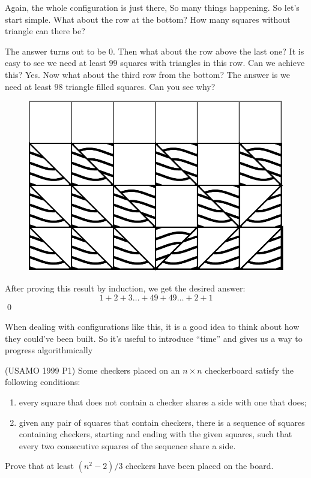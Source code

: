\documentclass[12pt,a4paper]{article}
\begin{document}
		\begin{solution}
			Again, the whole configuration is just there, So many things happening. So let's start simple. What about the row at the bottom? How many squares without triangle can there be?
			
			The answer turns out to be $ 0 $. Then what about the row above the last one? It is easy to see we need at least $ 99 $ squares with triangles in this row. Can we achieve this? Yes. Now what about the third row from the bottom? The answer is we need at least $ 98 $ triangle filled squares. Can you see why? 
			
			\begin{figure}[H]
				\begin{center}
					\includegraphics[width=.4\linewidth]{1.pdf}
				\end{center}
			\end{figure}
		
			After proving this result by induction, we get the desired answer:
			\[1+2+3\dots +49+49\dots + 2+1\]\hfill \qed
		\end{solution}
		
		
		When dealing with configurations like this, it is a good idea to think about how they could've been built. So it's useful to introduce ``time'' and gives us a way to progress algorithmically 
		
		\begin{example}(USAMO 1999 P1)
			Some checkers placed on an $ n \times n $ checkerboard satisfy the following conditions:
			
			\vspace{-1em} 
			
			\begin{enumerate}
				
				\item  every square that does not contain a checker shares a side with one that does;
				
				\item  given any pair of squares that contain checkers, there is a sequence of squares containing checkers, starting and ending with the given squares, such that every two consecutive squares of the sequence share a side.
			\end{enumerate}
			\vspace{-1em} 
			Prove that at least $ (n^{2}-2)/3 $ checkers have been placed on the board.
		\end{example}
	
\end{document}
